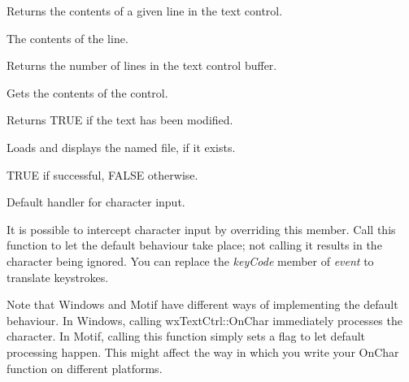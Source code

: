 Returns the contents of a given line in the text control.




The contents of the line.

\label{wxtextctrlgetnumberoflines}


Returns the number of lines in the text control buffer.

\label{wxtextctrlgetvalue}


Gets the contents of the control.

\label{wxtextctrlismodified}


Returns TRUE if the text has been modified.

\label{wxtextctrlloadfile}


Loads and displays the named file, if it exists.




TRUE if successful, FALSE otherwise.

\label{wxtextctrlonchar}


Default handler for character input.


It is possible to intercept character
input by overriding this member. Call this function
to let the default behaviour take place; not calling
it results in the character being ignored. You can
replace the {\it keyCode} member of {\it event} to
translate keystrokes.

Note that Windows and Motif have different ways
of implementing the default behaviour. In Windows,
calling wxTextCtrl::OnChar immediately
processes the character. In Motif,
calling this function simply sets a flag
to let default processing happen. This might affect
the way in which you write your OnChar function
on different platforms.

